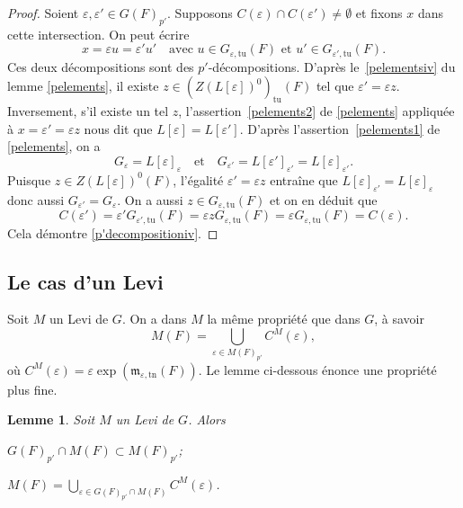 \documentclass[11pt]{article}
\numberwithin{equation}{section}\providecommand{\og}{«\,}\providecommand{\fg}{\,»}
\let\oldenumerate\enumerate
\renewcommand{\enumerate}{\oldenumerate\itemindent0pt}
\newenvironment{enumeratei}
{\bgroup\def\theenumi{\roman{enumi}}\def\theenumii{\arabic{enumii}}\oldenumerate}
{\endenumerate\egroup}
\let\epsilon\varepsilon
\newcommand{\quadet}{\quad\text{et}\quad}
\newcommand{\mfrm}{\mathfrak{m}}
\newcommand{\tn}{\mathrm{tn}}
\newcommand{\tu}{\mathrm{tu}}
\theoremstyle{plain}
\newtheorem*{lem*}{Lemme}
\theoremstyle{definition}
\begin{document}
\begin{proof}
Soient $\epsilon,\epsilon'\in G(F)_{p'}$. Supposons $C(\epsilon )\cap C(\epsilon ')\neq\emptyset$ et fixons $x$ dans cette intersection. On peut écrire
\[
x=\epsilon u=\epsilon 'u'\quad\text{avec }u\in G_{\epsilon ,\tu}(F)\text{ et } u'\in G_{\epsilon ',\tu}(F).
\]
Ces deux décompositions sont des $p'$-décompositions. D'après le~\eqref{pelementsiv} du lemme \ref{pelements}, il existe $z\in (Z(L[\epsilon ])^0)_{\tu}(F)$ tel que $\epsilon '=\epsilon z$. Inversement, s'il existe un tel $z$, l'assertion~\eqref{pelements2} de \ref{pelements} appliquée à $x=\epsilon'=\epsilon z$ nous dit que $L[\epsilon ]=L[\epsilon ']$. D'après l'assertion~\eqref{pelements1} de \ref{pelements}, on a
\[
G_{\epsilon }=L[\epsilon ]_{\epsilon }\quadet G_{\epsilon '}=L[\epsilon ']_{\epsilon '}=L[\epsilon ]_{\epsilon '}.
\]
Puisque $z\in Z(L[\epsilon ])^0(F)$, l'égalité $\epsilon '=\epsilon z$ entraîne que $L[\epsilon ]_{\epsilon '}=L[\epsilon ]_{\epsilon }$ donc aussi $G_{\epsilon '}=G_{\epsilon }$. On a aussi $z\in G_{\epsilon ,\tu}(F)$ et on en déduit que
\[
C(\epsilon ')=\epsilon 'G_{\epsilon ',\tu}(F)=\epsilon zG_{\epsilon ,\tu}(F)=\epsilon G_{\epsilon ,\tu}(F)=C(\epsilon ).
\]
Cela démontre \eqref{p'decompositioniv}.
\end{proof}

\subsection{Le cas d'un Levi}\label{lecasdunlevi}

Soit $M$ un Levi de $G$. On a dans $M$ la même propriété que dans $G$, à savoir
\[
M(F)=\bigcup_{\epsilon\in M(F)_{p'}}C^M(\epsilon),
\]
où $C^M(\epsilon)=\epsilon \exp(\mfrm_{\epsilon,\tn}(F))$. Le lemme ci-dessous énonce une propriété plus fine.

\begin{lem*}
Soit $M$ un Levi de $G$. Alors
\begin{enumeratei}
\item\label{lecasdunlevii}
$G(F)_{p'}\cap M(F)\subset M(F)_{p'}$;

\item\label{lecasdunleviii}
$M(F)=\bigcup_{\epsilon\in G(F)_{p'}\cap M(F)}C^M(\epsilon)$.
\end{enumeratei}
\end{lem*}
\end{document}
